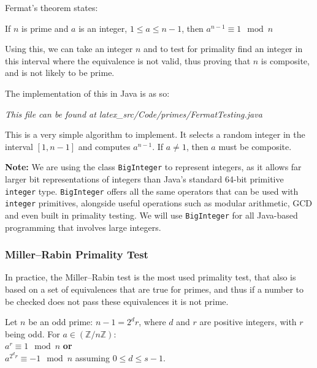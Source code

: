     Fermat's theorem states:
    
    \begin{center}
      If $n$ is prime and $a$ is an integer, $1 \leq a \leq n - 1$, then
      $a^{n-1} \equiv 1 \mod{n}$
    \end{center}
    
    Using this, we can take an integer $n$ and to test for primality find an integer in this interval where the equivalence is not valid, thus proving that $n$ is composite, and is not likely to be prime.
    
    The implementation of this in Java is as so:
    
    \lstset{language=Java}
    
    
    \emph{This file can be found at latex\_src/Code/primes/FermatTesting.java}
    
    This is a very simple algorithm to implement. It selects a random integer in the interval $[1,n-1]$ and computes $a^{n-1}$. If $a \neq 1$, then $a$ must be composite.
    
    \textbf{Note:} We are using the class \verb!BigInteger! to represent integers, as it allows far larger bit representations of integers than Java's standard 64-bit primitive \verb!integer! type. \verb!BigInteger! offers all the same operators that can be used with \verb!integer! primitives, alongside useful operations such as modular arithmetic, GCD and even built in primality testing. We will use \verb!BigInteger! for all Java-based programming that involves large integers.
    
    \subsubsection{Miller--Rabin Primality Test}
    
    In practice, the Miller--Rabin test is the most used primality test, that also is based on a set of equivalences that are true for primes, and thus if a number to be checked does not pass these equivalences it is not prime. \\
    
    \begin{mathdef}
      Let $n$ be an odd prime: $n - 1 = 2^dr$, where $d$ and $r$ are positive integers, with $r$ being odd. For $a \in (\mathbb{Z}/n\mathbb{Z})$: \\
      $a^r \equiv 1 \mod{n}$ \textbf{or} \\
      $a^{2^dr} \equiv -1 \mod{n}$ assuming $0 \leq d \leq s - 1$.
    \end{mathdef}
    
